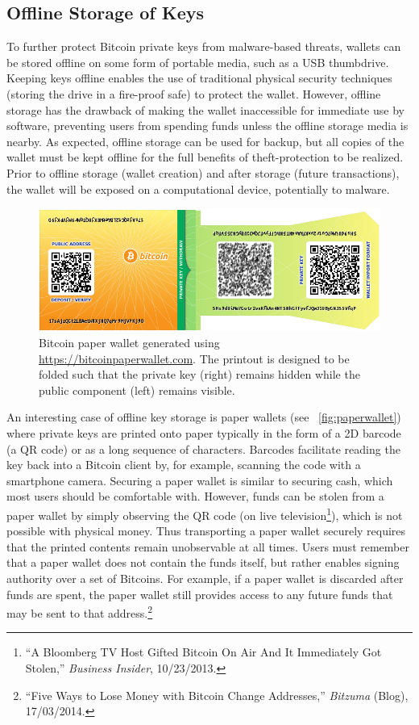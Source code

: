 \subsection{Offline Storage of Keys}
\label{sec:offline storage}
To further protect Bitcoin private keys from malware-based threats, wallets can be stored offline on some form of portable media, such as a USB thumbdrive. Keeping keys offline enables the use of traditional physical security techniques (\eg storing the drive in a fire-proof safe) to protect the wallet. However, offline storage has the drawback of making the wallet inaccessible for immediate use by software, preventing users from spending funds unless the offline storage media is nearby. As expected, offline storage can be used for backup, but all copies of the wallet must be kept offline for the full benefits of theft-protection to be realized. Prior to offline storage (wallet creation) and after storage (future transactions), the wallet will be exposed on a computational device, potentially to malware. 

\begin{figure}[pt]
  \includegraphics[width=.48\textwidth]{fig/paperwallet.png}
  \caption{Bitcoin paper wallet generated using \url{https://bitcoinpaperwallet.com}. The printout is designed to be folded such that the private key (right) remains hidden while the public component (left) remains visible.}
  \label{fig:paperwallet}
\end{figure}

An interesting case of offline key storage is paper wallets (see ~\autoref{fig:paperwallet})
where private keys are printed onto paper typically in the form of a 2D barcode (\eg a QR code) or as a long sequence of characters. Barcodes facilitate reading the key back into a Bitcoin client by, for example, scanning the code with a smartphone camera. Securing a paper wallet is similar to securing cash, which most users should be comfortable with. However, funds can be stolen from a paper wallet by simply observing the QR code (\eg on live television\footnote{``A Bloomberg TV Host Gifted Bitcoin On Air And It Immediately Got Stolen,'' \textit{Business Insider}, 10/23/2013.}), which is not possible with physical money. Thus transporting a paper wallet securely requires that the printed contents remain unobservable at all times.  Users must remember that a paper wallet does not contain the funds itself, but rather enables signing authority over a set of Bitcoins. For example, if a paper wallet is discarded after funds are spent, the paper wallet still provides access to any future funds that may be sent to that address.\footnote{``Five Ways to Lose Money with Bitcoin Change Addresses,'' \textit{Bitzuma} (Blog), 17/03/2014.} 

